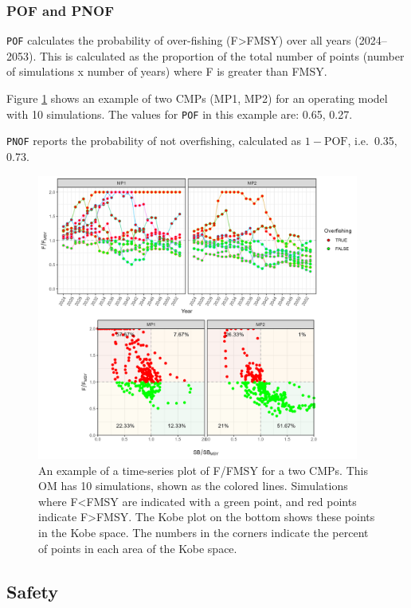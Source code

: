 \documentclass[
]{article}
\begin{document}
\hypertarget{pof-and-pnof}{%
\subsubsection{POF and PNOF}\label{pof-and-pnof}}

\texttt{POF} calculates the probability of over-fishing (F\textgreater FMSY) over all years (2024--2053). This is calculated as the proportion of the total number of points (number of simulations x number of years) where F is greater than FMSY.

Figure \ref{fig:POF} shows an example of two CMPs (MP1, MP2) for an operating model with 10 simulations. The values for \texttt{POF} in this example are: 0.65, 0.27.

\texttt{PNOF} reports the probability of not overfishing, calculated as \(1-\text{POF}\), i.e.~0.35, 0.73.

\begin{figure}
\includegraphics[width=400px]{../../img/PMs/POF} \caption{An example of a time-series plot of F/FMSY for a two CMPs. This OM has 10 simulations, shown as the colored lines. Simulations where F<FMSY are indicated with a green point, and red points indicate F>FMSY. The Kobe plot on the bottom shows these points in the Kobe space. The numbers in the corners indicate the percent of points in each area of the Kobe space.}\label{fig:POF}
\end{figure}

\hypertarget{safety}{%
\subsection{Safety}\label{safety}}
\end{document}
